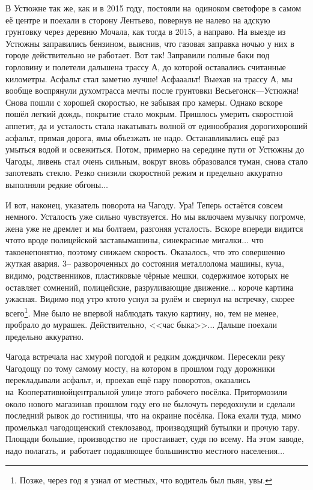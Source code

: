 В Устюжне так же, как и в 2015 году, постояли на~одиноком светофоре в самом её центре и поехали в сторону Лентьево, повернув не налево на адскую грунтовку через деревню Мочала, как тогда в 2015, а направо. На выезде из Устюжны заправились бензином, выяснив, что газовая заправка ночью у них в городе действительно не работает. Вот так! Заправили полные баки под горловину и полетели дальше\mdash на трассу А, до которой оставались считанные километры. Асфальт стал заметно лучше! Асфа\sdash а\sdash альт! Выехав на трассу А, мы вообще воспрянули духом\mdash трасса мечты после грунтовки Весьегонск\thinspace\nobreakdash---\thinspace Устюжна! Снова пошли с хорошей скоростью, не забывая про камеры. Однако вскоре пошёл легкий дождь, покрытие стало мокрым. Пришлось умерить скоростной аппетит, да и усталость стала накатывать волной от единообразия дороги\mdash хороший асфальт, прямая дорога, ямы объезжать не надо. Останавливались ещё раз умыться водой и освежиться. Потом, примерно на середине пути от Устюжны до Чагоды, ливень стал очень сильным, вокруг вновь образовался туман, снова стало запотевать стекло. Резко снизили скоростной режим и предельно аккуратно выполняли редкие обгоны$\ldots$

И вот, наконец, указатель поворота на Чагоду. Ура! Теперь остаётся совсем немного. Усталость уже сильно чувствуется. Но мы включаем музычку погромче, жена уже не дремлет и мы болтаем, разгоняя усталость. Вскоре впереди видится что\sdash то вроде полицейской заставы\mdash машины, сине\sdash красные мигалки$\ldots$ что такое\mdash непонятно, поэтому снижаем скорость. Оказалось, что это совершенно жуткая авария. 3\thinspace\nobreakdash-- развороченных до состояния металлолома машины, куча, видимо, родственников, пластиковые чёрные мешки, содержимое которых не оставляет сомнений, полицейские, разруливающие движение$\ldots$ короче картина ужасная. Видимо под утро кто\sdash то уснул за рулём и свернул на встречку, скорее всего\footnote{Позже, через год я узнал от местных, что водитель был пьян, увы.}. Мне было не впервой наблюдать такую картину, но, тем не менее, пробрало до мурашек. Действительно, <<час быка>>$\ldots$ Дальше поехали предельно аккуратно.

Чагода встречала нас хмурой погодой и редким дождичком. Пересекли реку Чагодощу по тому самому мосту, на котором в прошлом году дорожники перекладывали асфальт, и, проехав ещё пару поворотов, оказались на~Кооперативной\mdash центральной улице этого рабочего посёлка. Притормозили около нового магазина\mdash в прошлом году его не было\mdash чуть передохнули и сделали последний рывок до гостиницы, что на окраине посёлка. Пока ехали туда, мимо промелькал чагодощенский стеклозавод, производящий бутылки и прочую тару. Площади большие, производство не~простаивает, судя по всему. На этом заводе, надо полагать, и~работает подавляющее большинство местного населения$\ldots$

